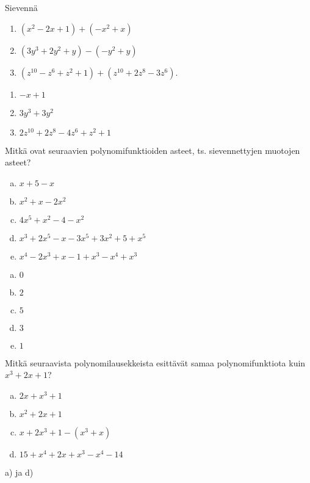 \begin{tehtavasivu}
\begin{tehtava}
    Sievennä
    \begin{enumerate}
        \item $(x^2 - 2x + 1) + (-x^2 + x) $
        \item $(3y^3 + 2y^2  + y) - (-y^2 + y)$
        \item $(z^{10} - z^6 + z^2 + 1) + (z^{10} + 2z^8 - 3z^6)$.
    \end{enumerate}
    \begin{vastaus}
        \begin{enumerate}
            \item $-x + 1$
            \item $3y^3 + 3y^2$
            \item $2z^{10} + 2z^8 - 4z^6 + z^2 + 1$
        \end{enumerate}
    \end{vastaus}
\end{tehtava}

\begin{tehtava}
	Mitkä ovat seuraavien polynomifunktioiden asteet, ts. sievennettyjen muotojen asteet?
	\begin{enumerate}[a)]
		\item $x+5-x$
		\item $x^2+x-2x^2$
		\item $4x^5+x^2-4-x^2$
		\item $x^3+2x^5-x-3x^5+3x^2+5+x^5$
		\item $x^4-2x^3+x-1+x^3-x^4+x^3$
	\end{enumerate}

	\begin{vastaus}
		\begin{enumerate}[a)]
			\item $0$
			\item $2$
			\item $5$
			\item $3$
			\item $1$
		\end{enumerate}
	\end{vastaus}
\end{tehtava}

\begin{tehtava}
	Mitkä seuraavista polynomilausekkeista esittävät samaa polynomifunktiota kuin
	$x^3+2x+1$?
	\begin{enumerate}[a)]
		\item $2x+x^3+1$
		\item $x^2+2x+1$
		\item $x+2x^3+1 - (x^3+x)$
		\item $15+x^4+2x+x^3-x^4-14$
	\end{enumerate}
	\begin{vastaus}
		a) ja d)
	\end{vastaus}
\end{tehtava}


\end{tehtavasivu}
